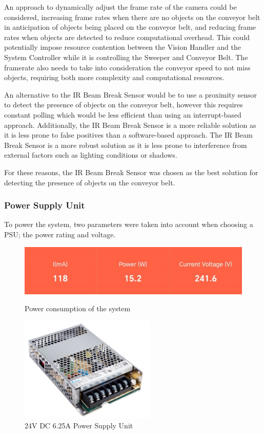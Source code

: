 An approach to dynamically adjust the frame rate of the camera could be considered, increasing frame rates when there are no objects on the conveyor belt in anticipation of objects being placed on the conveyor belt, and reducing frame rates when objects are detected to reduce computational overhead. This could potentially impose resource contention between the Vision Handler and the System Controller while it is controlling the Sweeper and Conveyor Belt. The framerate also needs to take into consideration the conveyor speed to not miss objects, requiring both more complexity and computational resources.

An alternative to the IR Beam Break Sensor would be to use a proximity sensor to detect the presence of objects on the conveyor belt, however this requires constant polling which would be less efficient than using an interrupt-based approach. Additionally, the IR Beam Break Sensor is a more reliable solution as it is less prone to false positives than a software-based approach. The IR Beam Break Sensor is a more robust solution as it is less prone to interference from external factors such as lighting conditions or shadows.

For these reasons, the IR Beam Break Sensor was chosen as the best solution for detecting the presence of objects on the conveyor belt.

\subsubsection{Power Supply Unit}
\label{sec:power-supply}
To power the system, two parameters were taken into account when choosing a PSU; the power rating and voltage.

\begin{figure}[H]
    \hfill
    \begin{minipage}[h]{0.45\textwidth}
        \centering
        \includegraphics[width=\textwidth]{imgs/parts/powermeter.png}
        \caption{Power consumption of the system}
        \label{fig:powermeter}
    \end{minipage}
    \hfill
    \begin{minipage}[h]{0.45\textwidth}
        \centering
        \includegraphics[height=5cm]{imgs/parts/psu.jpg}
        \caption{24V DC 6.25A Power Supply Unit \cite{psu}}
    \end{minipage}
    \hfill
\end{figure}

